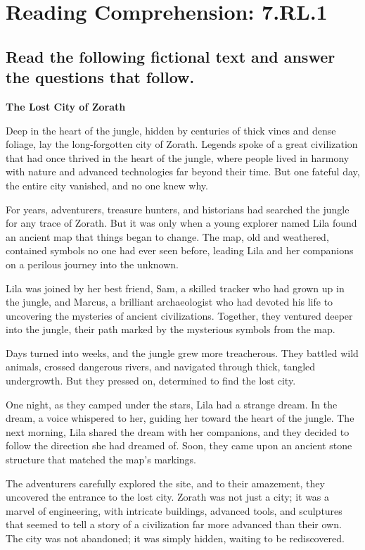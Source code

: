 \documentclass[12pt]{article}
\begin{document}
\onehalfspacing

\section*{Reading Comprehension: 7.RL.1}

\subsection*{Read the following fictional text and answer the questions that follow.}

\begin{flushleft}
\textbf{The Lost City of Zorath}
\end{flushleft}

Deep in the heart of the jungle, hidden by centuries of thick vines and dense foliage, lay the long-forgotten city of Zorath. Legends spoke of a great civilization that had once thrived in the heart of the jungle, where people lived in harmony with nature and advanced technologies far beyond their time. But one fateful day, the entire city vanished, and no one knew why.

For years, adventurers, treasure hunters, and historians had searched the jungle for any trace of Zorath. But it was only when a young explorer named Lila found an ancient map that things began to change. The map, old and weathered, contained symbols no one had ever seen before, leading Lila and her companions on a perilous journey into the unknown.

Lila was joined by her best friend, Sam, a skilled tracker who had grown up in the jungle, and Marcus, a brilliant archaeologist who had devoted his life to uncovering the mysteries of ancient civilizations. Together, they ventured deeper into the jungle, their path marked by the mysterious symbols from the map.

Days turned into weeks, and the jungle grew more treacherous. They battled wild animals, crossed dangerous rivers, and navigated through thick, tangled undergrowth. But they pressed on, determined to find the lost city. 

One night, as they camped under the stars, Lila had a strange dream. In the dream, a voice whispered to her, guiding her toward the heart of the jungle. The next morning, Lila shared the dream with her companions, and they decided to follow the direction she had dreamed of. Soon, they came upon an ancient stone structure that matched the map’s markings.

The adventurers carefully explored the site, and to their amazement, they uncovered the entrance to the lost city. Zorath was not just a city; it was a marvel of engineering, with intricate buildings, advanced tools, and sculptures that seemed to tell a story of a civilization far more advanced than their own. The city was not abandoned; it was simply hidden, waiting to be rediscovered.
\end{document}
